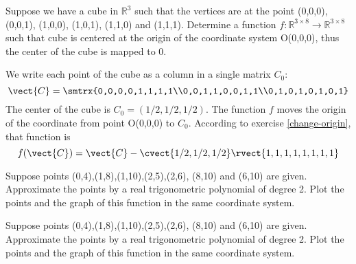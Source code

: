 \begin{exercise}
Suppose we have a cube in $\mathbb{R}^3$ such that the vertices are at the point (0,0,0), (0,0,1), (1,0,0), (1,0,1), (1,1,0) and (1,1,1). Determine a function $f:\mathbb{R}^{3\times8}\rightarrow\mathbb{R}^{3\times8}$ such that cube is centered at the origin of the coordinate system O(0,0,0), thus the center of the cube is mapped to 0.
\end{exercise}

\begin{solution}
We write each point of the cube as a column in a single matrix $C_0$:
\[ \vect{C}=\smtrx{0,0,0,0,1,1,1,1\\0,0,1,1,0,0,1,1\\0,1,0,1,0,1,0,1} \]
The center of the cube is $C_0=(1/2,1/2,1/2)$. The function $f$ moves the origin of the coordinate from point O(0,0,0) to $C_0$. According to exercise \ref{change-origin}, that function is 
\[ f(\vect{C})=\vect{C} - \cvect{1/2,1/2,1/2}\rvect{1,1,1,1,1,1,1,1} \]
\end{solution}

\begin{exercise}
Suppose points (0,4),(1,8),(1,10),(2,5),(2,6), (8,10) and (6,10) are given. Approximate the points by a real trigonometric polynomial of degree 2. Plot the points and the
graph of this function in the same coordinate system. 
\end{exercise}

\begin{solution}
Suppose points (0,4),(1,8),(1,10),(2,5),(2,6), (8,10) and (6,10) are given. Approximate the points by a real trigonometric polynomial of degree 2. Plot the points and the
graph of this function in the same coordinate system. 
\end{solution}